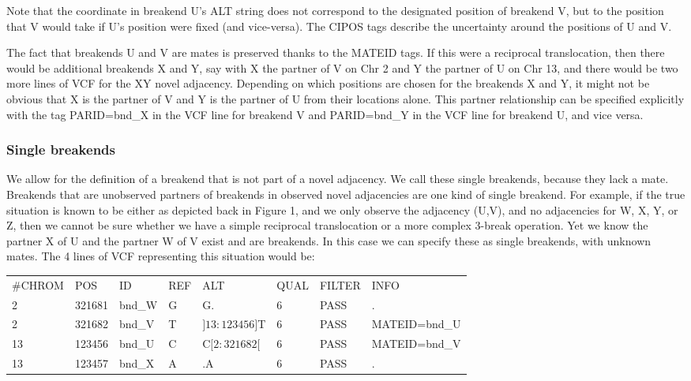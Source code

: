 \documentclass[8pt]{article}
\begin{document}
Note that the coordinate in breakend U's ALT string does not correspond to the designated position of breakend V, but to the position that V would take if U's position were fixed (and vice-versa).
The CIPOS tags describe the uncertainty around the positions of U and V.

The fact that breakends U and V are mates is preserved thanks to the MATEID tags.
If this were a reciprocal translocation, then there would be additional breakends X and Y, say with X the partner of V on Chr 2 and Y the partner of U on Chr 13, and there would be two more lines of VCF for the XY novel adjacency.
Depending on which positions are chosen for the breakends X and Y, it might not be obvious that X is the partner of V and Y is the partner of U from their locations alone.
This partner relationship can be specified explicitly with the tag PARID=bnd\_X in the VCF line for breakend V and PARID=bnd\_Y in the VCF line for breakend U, and vice versa.

\subsubsection{Single breakends}
We allow for the definition of a breakend that is not part of a novel adjacency.
We call these single breakends, because they lack a mate.
Breakends that are unobserved partners of breakends in observed novel adjacencies are one kind of single breakend.
For example, if the true situation is known to be either as depicted back in Figure 1, and we only observe the adjacency (U,V), and no adjacencies for W, X, Y, or Z, then we cannot be sure whether we have a simple reciprocal translocation or a more complex 3-break operation.
Yet we know the partner X of U and the partner W of V exist and are breakends. In this case we can specify these as single breakends, with unknown mates.
The 4 lines of VCF representing this situation would be:

\vspace{0.3cm}
\small
\begin{tabular}{ l l l l l l l l }
\#CHROM & POS & ID & REF & ALT & QUAL & FILTER & INFO \\
2 & 321681 & bnd\_W & G & G. & 6 & PASS & . \\
2 & 321682 & bnd\_V & T & $]13:123456]$T & 6 & PASS & MATEID=bnd\_U \\
13 & 123456 & bnd\_U & C & C$[2:321682[$ & 6 & PASS & MATEID=bnd\_V \\
13 & 123457 & bnd\_X & A & .A & 6 & PASS & . \\
\end{tabular}
\normalsize
\vspace{0.3cm}
\end{document}
